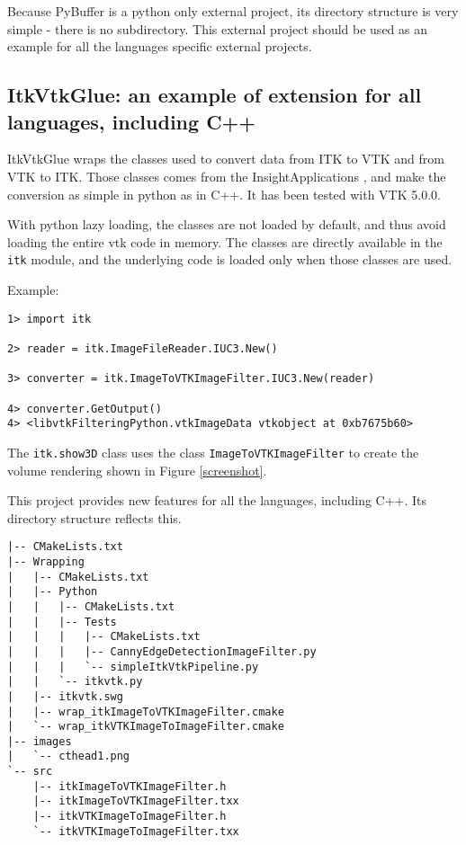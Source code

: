 \documentclass{InsightArticle}
\begin{document}
Because PyBuffer is a python only external project, its directory structure is very
simple - there is no subdirectory. This external project should be used as an example
for all the languages specific external projects.

    \subsection{ItkVtkGlue: an example of extension for all languages, including C++}

ItkVtkGlue wraps the classes used to convert data from ITK to VTK \cite{VtkWebSite} and from VTK to ITK.
Those classes comes from the InsightApplications \cite{ITKWebSite}, and make the conversion
as simple in python as in C++. It has been tested with VTK 5.0.0.

With python lazy loading, the classes are not loaded by default, and thus avoid
loading the entire vtk code in memory. The classes are directly available in the
\verb$itk$ module, and the underlying code is loaded only when those classes are used.

Example:
\begin{verbatim}
1> import itk

2> reader = itk.ImageFileReader.IUC3.New()

3> converter = itk.ImageToVTKImageFilter.IUC3.New(reader)

4> converter.GetOutput()
4> <libvtkFilteringPython.vtkImageData vtkobject at 0xb7675b60>
\end{verbatim}

The \verb$itk.show3D$ class uses the class \verb$ImageToVTKImageFilter$ to create the
volume rendering shown in Figure \ref{screenshot}.

This project provides new features for all the languages, including C++.
Its directory structure reflects this.

\begin{verbatim}
|-- CMakeLists.txt
|-- Wrapping
|   |-- CMakeLists.txt
|   |-- Python
|   |   |-- CMakeLists.txt
|   |   |-- Tests
|   |   |   |-- CMakeLists.txt
|   |   |   |-- CannyEdgeDetectionImageFilter.py
|   |   |   `-- simpleItkVtkPipeline.py
|   |   `-- itkvtk.py
|   |-- itkvtk.swg
|   |-- wrap_itkImageToVTKImageFilter.cmake
|   `-- wrap_itkVTKImageToImageFilter.cmake
|-- images
|   `-- cthead1.png
`-- src
    |-- itkImageToVTKImageFilter.h
    |-- itkImageToVTKImageFilter.txx
    |-- itkVTKImageToImageFilter.h
    `-- itkVTKImageToImageFilter.txx
\end{verbatim}
\end{document}
